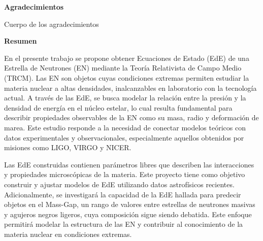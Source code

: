 \documentclass[8pt, letterpaper]{report}
\begin{document}
\clearpage
\thispagestyle{empty}
\vspace*{\fill}
\begin{flushleft}
    {\huge\bfseries Agradecimientos\par}
    \vspace{0.5cm}
	Cuerpo de los agradecimientos
    
\end{flushleft}
\vspace*{\fill}
\clearpage



\pagestyle{empty}
\vspace{0px}
\tableofcontents


\clearpage
\listoffigures
\clearpage

\clearpage
\vspace*{1cm} %
\begin{flushleft}
    {\huge\bfseries Resumen\par}
    \vspace{0.5cm}
    En el presente trabajo se propone obtener Ecuaciones de Estado (EdE) de una Estrella de Neutrones (EN) mediante la Teoría Relativista de Campo Medio (TRCM). Las EN son objetos cuyas condiciones extremas permiten estudiar la materia nuclear a altas densidades, inalcanzables en laboratorio con la tecnología actual. A través de las EdE, se busca modelar la relación entre  la presión y la densidad de energía en el núcleo estelar, lo cual resulta fundamental para describir propiedades observables de la EN como su masa,  radio y  deformación de marea. Este estudio responde a la necesidad de conectar modelos teóricos con datos experimentales y observacionales, especialmente  aquellos obtenidos por misiones como LIGO, VIRGO y NICER.
    
    Las EdE construidas contienen parámetros libres que describen las interacciones y propiedades microscópicas de la materia. Este proyecto tiene como objetivo construir y ajustar modelos de EdE utilizando datos astrofísicos recientes. Adicionalmente, se investigará la capacidad de la EdE hallada para predecir objetos en el Mass-Gap, un rango de valores entre estrellas de neutrones masivas y agujeros negros ligeros, cuya composición sigue siendo debatida. Este enfoque permitirá modelar la estructura de las EN y contribuir al conocimiento de la materia nuclear en condiciones extremas.

    
\end{flushleft}
\end{document}
